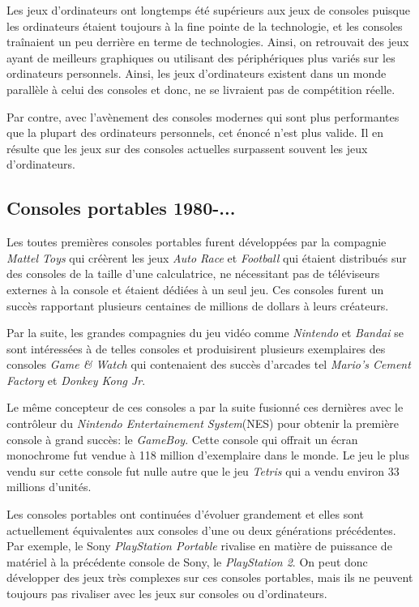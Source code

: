 \documentclass[12pt,twoside,letterpaper,francais]{book}
\begin{document}
Les jeux d'ordinateurs ont longtemps été supérieurs aux jeux de
consoles puisque les ordinateurs étaient toujours à la fine pointe de
la technologie, et les consoles traînaient un peu derrière en terme de
technologies. Ainsi, on retrouvait des jeux ayant de meilleurs
graphiques ou utilisant des périphériques plus variés sur les
ordinateurs personnels. Ainsi, les jeux d'ordinateurs existent dans un
monde parallèle à celui des consoles et donc, ne se livraient pas de
compétition réelle.

Par contre, avec l'avènement des consoles modernes qui sont plus
performantes que la plupart des ordinateurs personnels, cet énoncé
n'est plus valide. Il en résulte que les jeux sur des consoles
actuelles surpassent souvent les jeux d'ordinateurs.


\FloatBarrier
\subsection{Consoles portables 1980-...}
Les toutes premières consoles portables furent développées par la
compagnie \textit{Mattel Toys} qui créèrent les jeux \textit{Auto
  Race} et \textit{Football} qui étaient distribués sur des consoles
de la taille d'une calculatrice, ne nécessitant pas de téléviseurs
externes à la console et étaient dédiées à un seul jeu. Ces consoles
furent un succès rapportant plusieurs centaines de millions de dollars
à leurs créateurs.

Par la suite, les grandes compagnies du jeu vidéo comme
\textit{Nintendo} et \textit{Bandai} se sont intéressées à de telles
consoles et produisirent plusieurs exemplaires des consoles
\textit{Game \& Watch} qui contenaient des succès d'arcades tel
\textit{Mario's Cement Factory} et \textit{Donkey Kong Jr}.

Le même concepteur de ces consoles a par la suite fusionné ces
dernières avec le contrôleur du \textit{Nintendo Entertainement
  System}(NES) pour obtenir la première console à grand succès: le
\textit{GameBoy}. Cette console qui offrait un écran monochrome fut
vendue à 118 million d'exemplaire dans le monde. Le jeu le plus vendu
sur cette console fut nulle autre que le jeu \textit{Tetris} qui a
vendu environ 33 millions d'unités.

Les consoles portables ont continuées d'évoluer grandement et elles
sont actuellement équivalentes aux consoles d'une ou deux générations
précédentes. Par exemple, le Sony \textit{PlayStation Portable}
rivalise en matière de puissance de matériel à la précédente console
de Sony, le \textit{PlayStation 2}. On peut donc développer des jeux
très complexes sur ces consoles portables, mais ils ne peuvent toujours
pas rivaliser avec les jeux sur consoles ou d'ordinateurs.
\end{document}
